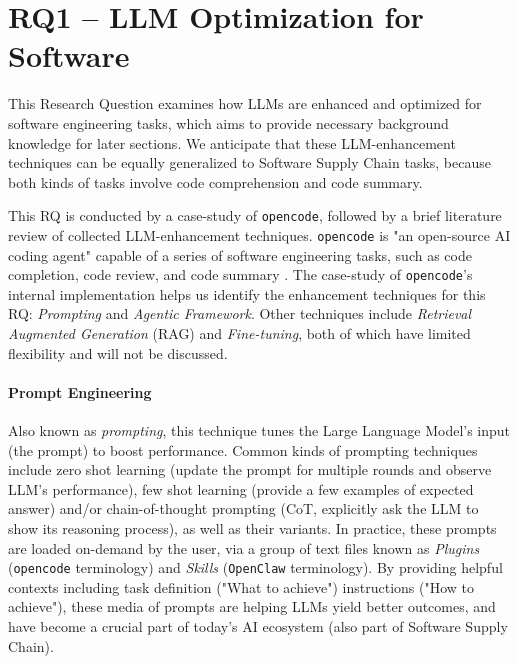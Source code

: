 \section{RQ1 -- LLM Optimization for Software}\label{sec:rq1}

\par This Research Question examines how LLMs are enhanced and optimized
for software
engineering tasks, which aims to provide necessary background knowledge
for later sections. We anticipate that these LLM-enhancement techniques
can be equally generalized to Software Supply Chain tasks, because both
kinds of tasks involve code comprehension and code summary. 

\par This RQ is conducted by a case-study of \texttt{opencode},
followed by a
brief literature review of collected LLM-enhancement techniques.
\texttt{opencode} is "an open-source AI coding agent" capable of
a series of software engineering tasks, such as code completion,
code review, and code summary \citep{opencode}. The case-study
of \texttt{opencode}'s internal implementation helps us identify 
the enhancement techniques for this RQ: \textit{Prompting}\citep{promptsurvey} 
and \textit{Agentic Framework}\citep{agents,agentsurvey}.
Other techniques include \textit{Retrieval Augmented Generation}
(RAG) \citep{ragsurvey} and \textit{Fine-tuning}, both of which have 
limited flexibility and will not be discussed.

\paragraph*{Prompt Engineering} Also known as \textit{prompting},
this technique tunes the Large Language Model's input (the prompt)
to boost performance. Common kinds of prompting
techniques include zero
shot learning \citep{zeroshot1, zeroshot2} (update the prompt
for multiple rounds and observe LLM's performance), few
shot learning \citep{fewshot1, fewshotlearner} (provide
a few examples of expected answer)
and/or chain-of-thought \citep{cotprompt}
prompting (CoT, explicitly ask the LLM to show its reasoning process),
as well as their variants.
In practice, these prompts are loaded on-demand by the user,
via a group of text files known as \textit{Plugins} 
(\texttt{opencode} terminology) and \textit{Skills}
(\texttt{OpenClaw}\citep{openclaw} terminology).
By providing helpful contexts including task definition ("What to achieve")
instructions ("How to achieve"), these media of prompts
are helping LLMs yield better outcomes, and have become
a crucial part of today's AI ecosystem (also part of
Software Supply Chain).

